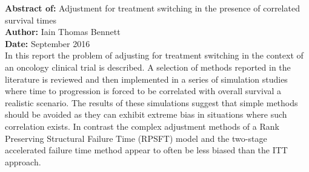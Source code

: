 \thispagestyle{plain}

\large{\textbf{Abstract of:} Adjustment for treatment switching in the presence of correlated survival times}\\[0.3cm]

\large{\textbf{Author:} Iain Thomas Bennett}\\[0.3cm]

\large{\textbf{Date:} September 2016}\\[0.3cm]


In this report the problem of adjusting for treatment switching in the context of an oncology clinical trial is described. A selection of methods reported in the literature is reviewed and then implemented in a series of simulation studies where time to progression is forced to be correlated with overall survival a realistic scenario. The results of these simulations suggest that simple methods should be avoided as they can exhibit extreme bias in situations where such correlation exists. In contrast the complex adjustment methods of a Rank Preserving Structural Failure Time (RPSFT) model and the two-stage accelerated failure time method appear to often be less biased than the ITT approach.
